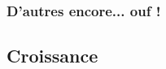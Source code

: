 \documentclass[10pt]{beamer}
\begin{document}

\begin{frame}
\frametitle{\bf D'autres encore... ouf !} 
\medskip 

\qquad \qquad \grapheEXP \qquad \grapheEXPinv 

\qquad \qquad \grapheLN \qquad \grapheLNinv

\grapheSINH \qquad \grapheCOSH \qquad \grapheTANH

\end{frame}


\subsection{Croissance} 
\end{document}

